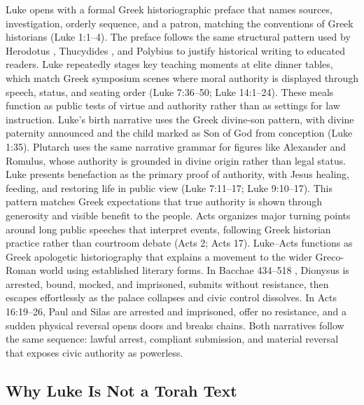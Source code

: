 Luke opens with a formal Greek historiographic preface that names sources, investigation, orderly sequence, and a patron, matching the conventions of Greek historians (Luke 1:1--4).
The preface follows the same structural pattern used by Herodotus \cite{herodotus:histories}, Thucydides \cite{thucydides:peloponnesian}, and Polybius \cite{polybius:histories} to justify historical writing to educated readers.
Luke repeatedly stages key teaching moments at elite dinner tables, which match Greek symposium scenes where moral authority is displayed through speech, status, and seating order (Luke 7:36--50; Luke 14:1--24).
These meals function as public tests of virtue and authority rather than as settings for law instruction.
Luke's birth narrative uses the Greek divine-son pattern, with divine paternity announced and the child marked as Son of God from conception (Luke 1:35).
Plutarch \cite{plutarch:lives} uses the same narrative grammar for figures like Alexander and Romulus, whose authority is grounded in divine origin rather than legal status.
Luke presents benefaction as the primary proof of authority, with Jesus healing, feeding, and restoring life in public view (Luke 7:11--17; Luke 9:10--17).
This pattern matches Greek expectations that true authority is shown through generosity and visible benefit to the people.
Acts organizes major turning points around long public speeches that interpret events, following Greek historian practice rather than courtroom debate (Acts 2; Acts 17).
Luke--Acts functions as Greek apologetic historiography that explains a movement to the wider Greco-Roman world using established literary forms.
In Bacchae 434--518 \cite[434--518]{euripides:bacchae}, Dionysus is arrested, bound, mocked, and imprisoned, submits without resistance, then escapes effortlessly as the palace collapses and civic control dissolves.
In Acts 16:19--26, Paul and Silas are arrested and imprisoned, offer no resistance, and a sudden physical reversal opens doors and breaks chains.
Both narratives follow the same sequence: lawful arrest, compliant submission, and material reversal that exposes civic authority as powerless.

\subsection{Why Luke Is Not a Torah Text}

